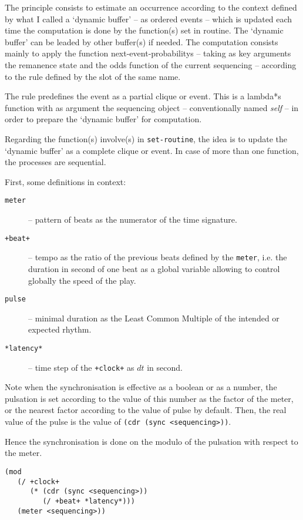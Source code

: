 \bigskip

The principle consists to estimate an occurrence according to the context defined by what I called a `dynamic buffer' -- as ordered events -- which is updated each time the computation is done by the function(s) set in routine. The `dynamic buffer' can be leaded by other buffer(s) if needed. The computation consists mainly to apply the function \glspl{next-event-probability} -- taking as key arguments the remanence state and the odds function of the current sequencing --  according to the rule defined by the slot of the same name. 

The rule predefines the event as a partial clique or event. This is a \glspl{lambda*} function with as argument the sequencing object -- conventionally named \textit{self} -- in order to prepare the `dynamic buffer' for computation.
 
Regarding the function(s) involve(s) in \texttt{set-routine}, the idea is to update the `dynamic buffer' as a complete clique or event. In case of more than one function, the processes are sequential. 

\bigskip
\bigskip


\bigskip

First, some definitions in context:
\begin{description}
\item[\texttt{meter}] -- pattern of beats as the numerator of the time signature.
\item[\texttt{+beat+}] -- tempo as the ratio of the previous beats defined by the \texttt{meter}, i.e. the duration in second of one beat as a global variable allowing to control globally the speed of the play.
\item[\texttt{pulse}] -- minimal duration as the Least Common Multiple of the intended or expected rhythm.
\item[\texttt{*latency*}] -- time step of the \texttt{+clock+} as $dt$ in second.
\end{description}
   
   \smallskip
   
Note when the synchronisation is effective as a boolean or as a number, the pulsation is set according to the value of this number as the factor of the meter, or the nearest factor according to the value of pulse by default. Then, the real value of the pulse is the value of \texttt{(cdr (sync <sequencing>))}.  

Hence the synchronisation is done on the modulo of the pulsation with respect to the meter.
\begin{lstlisting}[language=N3]
(mod 
   (/ +clock+ 
      (* (cdr (sync <sequencing>)) 
         (/ +beat+ *latency*))) 
   (meter <sequencing>))   
\end{lstlisting}

